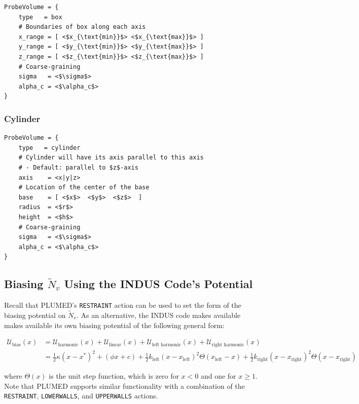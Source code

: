 \documentclass[11pt,notitlepage]{article}
\begin{document}
\begin{lstlisting}
ProbeVolume = {
	type   = box
	# Boundaries of box along each axis
	x_range = [ <$x_{\text{min}}$> <$x_{\text{max}}$> ]
	y_range = [ <$y_{\text{min}}$> <$y_{\text{max}}$> ]
	z_range = [ <$z_{\text{min}}$> <$z_{\text{max}}$> ]
	# Coarse-graining
	sigma   = <$\sigma$>
	alpha_c = <$\alpha_c$>
}
\end{lstlisting}


\subsubsection{Cylinder}

\begin{lstlisting}
ProbeVolume = {
	type   = cylinder
	# Cylinder will have its axis parallel to this axis 
	# - Default: parallel to $z$-axis
	axis    = <x|y|z>
	# Location of the center of the base
	base    = [ <$x$>  <$y$>  <$z$>  ]
	radius  = <$r$>
	height  = <$h$>
	# Coarse-graining
	sigma   = <$\sigma$>
	alpha_c = <$\alpha_c$>
}
\end{lstlisting}


\subsection{Biasing $\tilde{N}_v$ Using the INDUS Code's Potential}

Recall that PLUMED's \texttt{RESTRAINT} action can be used to set the form of the biasing potential on $\tilde{N}_v$. As an alternative, the INDUS code makes available makes available its own biasing potential of the following general form:

\begin{align}
	\mathcal{U}_{\text{bias}}(x) 
	&= \mathcal{U}_{\text{harmonic}}(x) + \mathcal{U}_{\text{linear}}(x)
	     + \mathcal{U}_{\text{left harmonic}}(x) + \mathcal{U}_{\text{right harmonic}}(x) \\
	\label{eqn:generalbias}
	&= \frac{1}{2} \kappa (x - x^*)^2 + (\phi x + c)
	   + \frac{1}{2} k_{\text{left}}  (x - x_{\text{left}})^2 \Theta(x_{\text{left}} - x)
	   + \frac{1}{2} k_{\text{right}} (x - x_{\text{right}})^2 \Theta(x - x_{\text{right}})
\end{align}

\noindent where $\Theta(x)$ is the unit step function, which is zero for $x < 0$ and one for $x \ge 1$. Note that PLUMED supports similar functionality with a combination of the \texttt{RESTRAINT}, \texttt{LOWERWALLS}, and \texttt{UPPERWALLS} actions.
\end{document}
